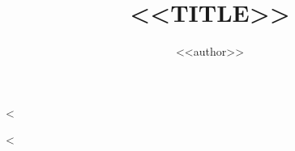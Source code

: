 \documentclass[openany,final,12pt]{memoir}
\title{{\operafontfamily\Huge\MakeUppercase{<<title>>}}}
\author{{\operafontfamily\Large{}<<author>>}}
\begin{document}
\frontmatter

\maketitle


\tableofcontents*

\mainmatter

\raggedbottom %

<%
\label{<<name>>}

<%

\backmatter
\end{document}
